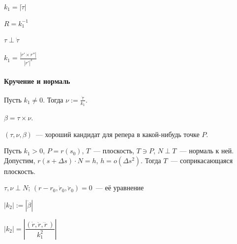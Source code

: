 \documentclass[draft,timbord]{longnotes}
\begin{document}
\begin{defn}[Кривизна]\label{defn:dg::curvature}
  $k_1 = |\dot \tau |$
\end{defn}
\begin{defn}\label{defn:dg::curvature::rad}
  $R = k_1 ^{-1}$
\end{defn}

\begin{prop}\label{prop:dg::curvature::orth}
  $\tau \perp \dot \tau$
\end{prop}

\begin{thrm}\label{thrm:dg::curvature::repar}
  $\displaystyle k_1 = \frac{| r' \times r''|}{|r'|^3} $
\end{thrm}

\paragraph{Кручение и нормаль}
\label{par:dg::norm}

\begin{defn}[Нормаль]\label{defn:dg::norm::norm}
  Пусть $k_1 \neq 0$. Тогда $\nu  := \frac{\dot \tau } {k_1}$.
\end{defn}
\begin{defn}[Бинормаль]\label{defn:dg::norm::binorm}
  $\beta = \tau \times \nu $.
\end{defn}

\begin{rem*}
  $(\tau,\nu,\beta)$~--- хороший кандидат для репера в какой-нибудь точке $P$.
\end{rem*}
\begin{defn}\label{defn:dg::norm::tangpl}
  Пусть $k_1 > 0$, $P = r(s_0)$, $T$~--- плоскость, $T \ni P$, $N \perp T$~--- нормаль к ней.
  Допустим, $r(s+\Delta s) \cdot N  = h$, $h = o(\Delta s^2)$. Тогда $T$~--- соприкасающаяся
  плоскость.
\end{defn}
\begin{prop}\label{prop:dg::norm::tangpl}
  $ \tau , \nu \perp N  $;
  $(r-r_0, \dot r_0 , \ddot r_0)=0$~--- её уравнение
\end{prop}

\begin{defn}\label{defn:dg::norm::abscrvn}
  $|k_2| := | \dot\beta|$
\end{defn}
\begin{thrm}\label{thrm:dg::norm::abscrvn}
  $|k_2| = \left|\dfrac{(\dot r, \ddot r, \dddot r\,)}{k_1^2}\right|$
\end{thrm}
\end{document}
